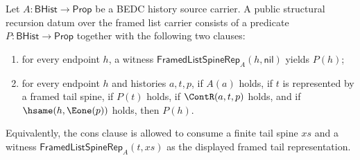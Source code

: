 \begin{definition}
\label{def:list-public-structural-recursion-data}
Let $A:\mathsf{BHist}\to\mathsf{Prop}$ be a BEDC history source carrier. A
public structural recursion datum over the framed list carrier consists of a
predicate $P:\mathsf{BHist}\to\mathsf{Prop}$ together with the following two
clauses:
\begin{enumerate}
  \item for every endpoint $h$, a witness
  $\mathsf{FramedListSpineRep}_A(h,\mathsf{nil})$ yields $P(h)$;
  \item for every endpoint $h$ and histories $a,t,p$, if $A(a)$ holds, if
  $t$ is represented by a framed tail spine, if $P(t)$ holds, if
  $\ContR(a,t,p)$ holds, and if $\hsame(h,\Eone(p))$ holds, then $P(h)$.
\end{enumerate}
Equivalently, the cons clause is allowed to consume a finite tail spine $xs$
and a witness $\mathsf{FramedListSpineRep}_A(t,xs)$ as the displayed framed
tail representation.
\end{definition}

